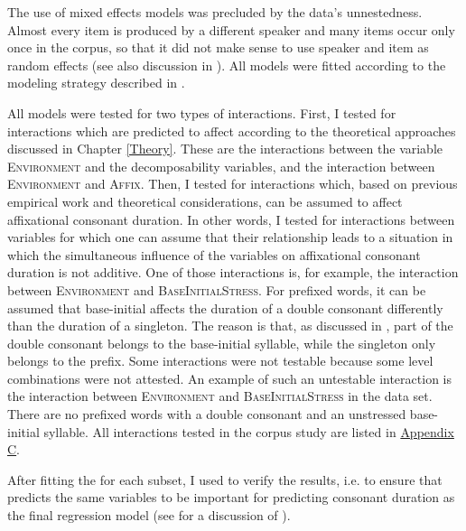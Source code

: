 The use of mixed effects models was precluded by the data's unnestedness. Almost every item is produced by a different speaker and many items occur only once in the corpus, so that it did not make sense to use speaker and item as random effects (see also discussion in ). All models were fitted according to the modeling strategy described in .



All models were tested for two types of  interactions. First, I tested for interactions which are predicted to affect  according to the theoretical approaches discussed in Chapter \ref{Theory}. These  are the interactions between the variable \textsc{Environment} and the decomposability variables, and the interaction between \textsc{Environment} and \textsc{Affix}.
Then, I tested for interactions which, based on previous empirical work and theoretical considerations, can be assumed to affect affixational consonant duration. In other words, I tested for interactions between variables for which one can assume that their relationship leads to a situation in which the simultaneous influence of the variables on affixational consonant duration is not additive. One of those interactions is, for example, the interaction between \textsc{Environment} and \textsc{BaseInitialStress}. For prefixed words, it can be assumed that base-initial  affects the duration of a double consonant differently than the duration of a singleton. The reason is that, as discussed in , part of the double consonant belongs to the base-initial syllable, while the singleton only belongs to the prefix. 
Some interactions were not testable because some level combinations were not attested. An example of such an untestable interaction is the interaction between \textsc{Environment} and \textsc{BaseInitialStress} in the data set. There are no prefixed words with a double consonant and an unstressed base-initial syllable. All interactions tested in the corpus study are listed in \hyperref[Appendix C: Summaries of tested interactions in corpus study]{Appendix C}.\largerpage

After fitting the  for each subset, I used  to verify the results, i.e. to ensure that  predicts the same variables to be important for predicting consonant duration as the final regression model (see  for a discussion of ).




